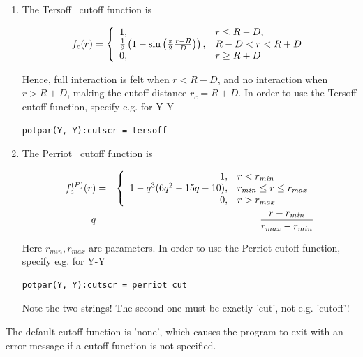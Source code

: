 \documentclass[a4paper,12pt,pdftex,onecolumn]{article}
\begin{document}
\begin{enumerate}
\item The Tersoff~\cite{Tersoff-PRL56-1986} cutoff function is

\begin{equation}
f_c(r) =
\left\{
\begin{array}{ll}
1,                   & r \leq R - D, \\
{1 \over 2} \left( 1 - \sin \left( {\pi \over 2} {r - R \over D}
    \right) \right), & R-D < r < R + D \\
0,                   & r \geq R + D
\end{array}
\right.
\end{equation}

Hence, full interaction is felt when $r<R-D$, and no interaction when $r>R+D$,
making the cutoff distance $r_c = R+D$.
In order to use the Tersoff cutoff function, specify e.g. for Y-Y

\begin{Verbatim}[fontsize=\relsize{-1},frame=single]
  potpar(Y, Y):cutscr = tersoff
\end{Verbatim}

\item The Perriot~\cite{Perriot-2013} cutoff function is

\begin{eqnarray}
f^{(P)}_{c}(r) &=& \left\{
\begin{array}{rl}
1, &  r < r_{min} \\
1 - q^3 (6 q^2 - 15 q - 10), & r_{min} \leq r \leq r_{max} \\
0, & r > r_{max}
\end{array}
\right.
\\
q &=& {r - r_{min} \over r_{max} - r_{min}}
\end{eqnarray}

Here $r_{min},r_{max}$ are parameters.
In order to use the Perriot cutoff function, specify e.g. for Y-Y

\begin{Verbatim}[fontsize=\relsize{-1},frame=single]
  potpar(Y, Y):cutscr = perriot cut
\end{Verbatim}

Note the two strings! The second one must be exactly 'cut', not e.g. 'cutoff'!
\end{enumerate}

The default cutoff function is 'none', which causes the program to exit with an error message
if a cutoff function is not specified.
\end{document}

